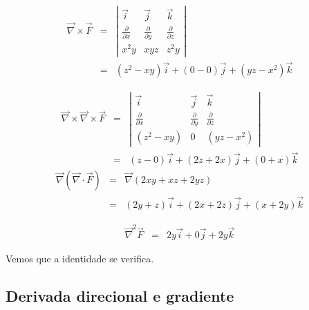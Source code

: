 \begin{resol}


 \begin{eqnarray*}
   \vec{\nabla}\times \vec{F}&=&\left|
   \begin{array}{ccc}
    \vec{i}&\vec{j}&\vec{k}\\[.5cm]
    \frac{\partial }{\partial x}&\frac{\partial }{\partial y}&\frac{\partial }{\partial z}\\[.5cm]
    x^2y&xyz&z^2y
   \end{array}\right|\\
   &=&\left(z^2-xy\right)\vec{i}+\left(0-0\right)\vec{j}+\left(yz-x^2\right)\vec{k}
 \end{eqnarray*}

 \begin{eqnarray*}
   \vec{\nabla}\times\vec{\nabla}\times \vec{F}&=&\left|
   \begin{array}{ccc}
    \vec{i}&\vec{j}&\vec{k}\\[.5cm]
    \frac{\partial }{\partial x}&\frac{\partial }{\partial y}&\frac{\partial }{\partial z}\\[.5cm]
    (z^2-xy)&0&(yz-x^2)
   \end{array}\right|\\
   &=&\left(z-0\right)\vec{i}+\left(2z+2x\right)\vec{j}+\left(0+x\right)\vec{k}
 \end{eqnarray*}
 \begin{eqnarray*}
  \vec{\nabla}(\vec{\nabla}\cdot\vec{F})&=&\vec{\nabla}(2xy+xz+2yz)\\
  &=&(2y+z)\vec{i}+(2x+2z)\vec{j}+(x+2y)\vec{k}
 \end{eqnarray*}

\begin{eqnarray*}
  \vec{\nabla}^2\vec{F}&=&2y\vec{i}+0\vec{j}+2y\vec{k}
 \end{eqnarray*}

 Vemos que a identidade se verifica.

\end{resol}



\subsection{Derivada direcional e gradiente}

